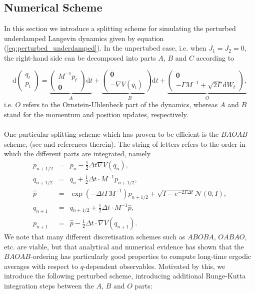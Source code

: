 
\subsection{Numerical Scheme}
\label{sec:numerical_scheme}

In this section we introduce a splitting scheme for simulating
the perturbed underdamped Langevin dynamics given by equation (\ref{eq:perturbed_underdamped}).
In the unpertubed case, i.e. when $J_{1}=J_{2}=0$, the right-hand side
can be decomposed into parts $A$, $B$ and $C$ according to 

\[
\mathrm{d}\left(\begin{array}{c}
q_{t}\\
p_{t}
\end{array}\right)=\underbrace{\left(\begin{array}{c}
	M^{-1}p_{t}\\
	\boldsymbol{0}
	\end{array}\right)\mathrm{d}t}_{A}+\underbrace{\left(\begin{array}{c}
	\boldsymbol{0}\\
	-\nabla V(q_{t})
	\end{array}\right)\mathrm{d}t}_{B}+\underbrace{\left(\begin{array}{c}
	\boldsymbol{0}\\
	-\Gamma M^{-1}+\sqrt{2\Gamma}\mathrm{d}W_{t}
	\end{array}\right),}_{O}
\]
i.e. $O$ refers to the Ornstein-Uhlenbeck part of the dynamics, whereas $A$ and $B$ stand for the momentum and position updates, respectively.
\\\\
One particular splitting scheme which has proven to be efficient is the  $BAOAB$ scheme, (see \cite{LeimkuhlerMatthews2015} and references therein).  The string
of letters refers to the order in which the different parts are integrated, namely
\begin{subequations}
\begin{eqnarray}
p_{n+1/2} & = & p_{n}-\frac{1}{2}\Delta t\nabla V(q_{n}),\\
q_{n+1/2} & = & q_{n}+\frac{1}{2}\Delta t\cdot M^{-1}p_{n+1/2},\\
\hat{p}   & = & \exp(-\Delta t\Gamma M^{-1})p_{n+1/2}+\sqrt{I-e^{-2\Gamma\Delta t}}\mathcal{N}(0,I),\label{eq:OU-step-1}\\
q_{n+1}   & = & q{}_{n+1/2}+\frac{1}{2}\Delta t\cdot M^{-1}\hat{p},\\
p_{n+1}   & = & \hat{p}-\frac{1}{2}\Delta t\cdot\nabla V(q_{n+1}).
\end{eqnarray}
\end{subequations}
We note that many different discretisation schemes such as $ABOBA$,
$OABAO$, etc. are viable, but that analytical and numerical evidence
has shown that the $BAOAB$-ordering has particularly good properties
to compute long-time ergodic averages with respect to $q$-dependent observables.
Motivated by this, we introduce the following perturbed scheme,
introducing additional Runge-Kutta integration steps between the $A$, $B$ and
$O$ parts:

